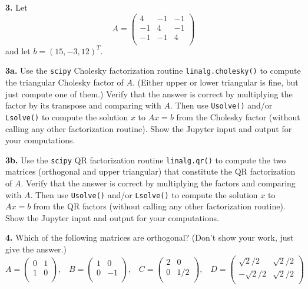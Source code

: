 \documentclass[11pt]{article}
\begin{document}
\par\bigskip
{\bf 3.} 
Let
$$A =
   \left(
   \begin{array}{ccc}
    4 & -1 & -1 \\ 	
   -1 &  4 & -1 \\ 
   -1 & -1 &  4 \\
   \end{array} \right)
$$
and let $b = (15, -3, 12)^T$.

\par\medskip
{\bf 3a.}
Use the {\tt scipy} Cholesky factorization routine {\tt linalg.cholesky()}
to compute the triangular Cholesky factor of $A$.
(Either upper or lower triangular is fine, but just compute one of them.)
Verify that the answer is correct by multiplying the factor by its transpose and
comparing with $A$.
Then use {\tt Usolve()} and/or {\tt Lsolve()} to compute the solution $x$
to $Ax=b$ from the Cholesky factor (without calling any other factorization routine).
Show the Jupyter input and output for your computations.

\par\medskip
{\bf 3b.}
Use the {\tt scipy} QR factorization routine {\tt linalg.qr()}
to compute the two matrices (orthogonal and upper triangular) that
constitute the QR factorization of $A$.
Verify that the answer is correct by multiplying the factors and comparing with $A$.
Then use {\tt Usolve()} and/or {\tt Lsolve()} to compute the solution $x$
to $Ax=b$ from the QR factors (without calling any other factorization routine).
Show the Jupyter input and output for your computations.

\par\bigskip
{\bf 4.}
Which of the following matrices are orthogonal?
(Don't show your work, just give the answer.)
$$
   A =
   \left(
   \begin{array}{cc}
    0 & 1 \\ 	
    1 & 0 \\ 
   \end{array} \right), 
   \hspace{10pt}
   B =
   \left(
   \begin{array}{cc}
    1 & 0 \\ 	
    0 & -1 \\ 
   \end{array} \right), 
   \hspace{10pt}
   C =
   \left(
   \begin{array}{cc}
    2 & 0 \\ 	
    0 & 1/2 \\ 
   \end{array} \right), 
   \hspace{10pt}
   D =
   \left(
   \begin{array}{cc}
    \sqrt 2 / 2 & \sqrt 2 / 2 \\ 	
    -\sqrt 2 / 2 & \sqrt 2 / 2 \\ 	
   \end{array} \right)
$$
\end{document}
